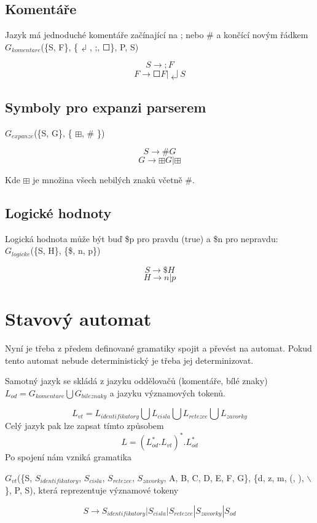 \documentclass[a4paper,11pt]{article}
\begin{document}
\subsection{Komentáře}
Jazyk má jednoduché komentáře začínající na ; nebo \# a končící novým řádkem $G_{komentare}$(\{S, F\}, \{$\dlsh$, ;, $\Square$\}, P, S)

$$S \rightarrow ;F $$
$$F \rightarrow \Square F | \dlsh S$$

\subsection{Symboly pro expanzi parserem}

$G_{expanze}$(\{S, G\}, \{ $\boxplus$, \# \})

$$S \rightarrow \#G$$
$$G \rightarrow \boxplus G | \boxplus$$

Kde $\boxplus$ je množina všech nebilých znaků včetně \#. 

\subsection{Logické hodnoty}
Logická hodnota může být buď \$p pro pravdu (true) a \$n pro nepravdu:
\\
$G_{logicke}$(\{S, H\}, \{\$, n, p\})

$$S \rightarrow \$H$$
$$H \rightarrow n | p$$

\section{Stavový automat}
Nyní je třeba z předem definované gramatiky spojit a převést na automat. Pokud tento automat nebude deterministický je třeba jej determinizovat.

Samotný jazyk se skládá z jazyku oddělovačů (komentáře, bílé znaky) $L_{od} = G_{komentare} \bigcup G_{bileznaky}$ a jazyku významových tokenů. 

$$L_{vt} = L_{identifikatory} \bigcup L_{cisla} \bigcup L_{retezce} \bigcup L_{zavorky}$$
Celý jazyk pak lze zapsat tímto způsobem 
$$L = (L^{*}_{od}.L_{vt})^{*}.L^{*}_{od}$$
Po spojení nám vzniká gramatika
 
$G_{vt}$(\{S, $S_{identifikatory}$, $S_{cisla}$, $S_{retezce}$, $S_{zavorky}$, A, B, C, D, E, F, G\}, \{d, z, m, (, ), $\backslash$ \}, P, S), která reprezentuje významové tokeny 

$$S \rightarrow S_{identifikatory} | S_{cisla} | S_{retezce} | S_{zavorky} | S_{od}$$
\end{document}
